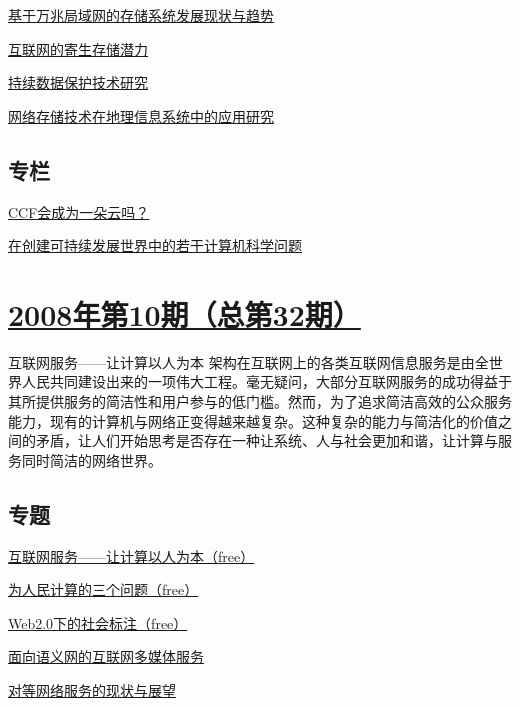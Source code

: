 \documentclass[a4paper]{article}
\begin{document}
\href{http://history.ccf.org.cn/resources/1190201776262/2010/04/15/033050.pdf}{基于万兆局域网的存储系统发展现状与趋势}

\href{http://history.ccf.org.cn/resources/1190201776262/2010/04/15/033059.pdf}{互联网的寄生存储潜力}

\href{http://history.ccf.org.cn/resources/1190201776262/2010/04/15/033063.pdf}{持续数据保护技术研究}

\href{http://history.ccf.org.cn/resources/1190201776262/2010/04/15/033068.pdf}{网络存储技术在地理信息系统中的应用研究}

\subsection{专栏}
\href{http://history.ccf.org.cn/resources/1190201776262/2010/04/15/033080.pdf}{CCF会成为一朵云吗？}

\href{http://history.ccf.org.cn/resources/1190201776262/2010/04/15/033074.pdf}{在创建可持续发展世界中的若干计算机科学问题}


\section{\href{http://history.ccf.org.cn/sites/ccf/jsjtbbd.jsp?contentId=2542567629013}{\textbf{2008年第10期（总第32期）}}}
互联网服务——让计算以人为本 架构在互联网上的各类互联网信息服务是由全世界人民共同建设出来的一项伟大工程。毫无疑问，大部分互联网服务的成功得益于其所提供服务的简洁性和用户参与的低门槛。然而，为了追求简洁高效的公众服务能力，现有的计算机与网络正变得越来越复杂。这种复杂的能力与简洁化的价值之间的矛盾，让人们开始思考是否存在一种让系统、人与社会更加和谐，让计算与服务同时简洁的网络世界。
\subsection{专题}
\href{http://history.ccf.org.cn/resources/1190201776262/2010/04/15/032012.pdf}{互联网服务——让计算以人为本（free）}

\href{http://history.ccf.org.cn/resources/1190201776262/2010/04/15/032015.pdf}{为人民计算的三个问题（free）}

\href{http://history.ccf.org.cn/resources/1190201776262/2010/04/15/032022.pdf}{Web2.0下的社会标注（free）}

\href{http://history.ccf.org.cn/resources/1190201776262/2010/04/15/032029.pdf}{面向语义网的互联网多媒体服务}

\href{http://history.ccf.org.cn/resources/1190201776262/2010/04/15/032035.pdf}{对等网络服务的现状与展望}
\end{document}

